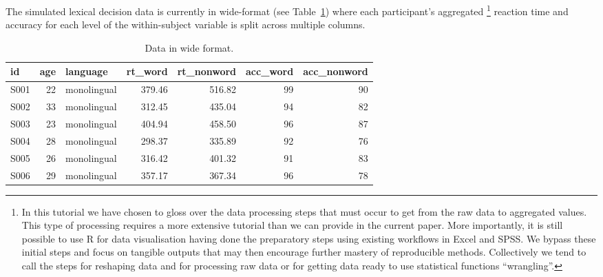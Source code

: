 \documentclass[
  english,
  doc,floatsintext]{apa6}
\begin{document}
The simulated lexical decision data is currently in wide-format (see Table~\ref{tab:wide-data}) where each participant's aggregated \footnote{In this tutorial we have chosen to gloss over the data processing steps that must occur to get from the raw data to aggregated values. This type of processing requires a more extensive tutorial than we can provide in the current paper. More importantly, it is still possible to use R for data visualisation having done the preparatory steps using existing workflows in Excel and SPSS. We bypass these initial steps and focus on tangible outputs that may then encourage further mastery of reproducible methods. Collectively we tend to call the steps for reshaping data and for processing raw data or for getting data ready to use statistical functions ``wrangling''.} reaction time and accuracy for each level of the within-subject variable is split across multiple columns.

\begin{table}

\caption{\label{tab:wide-data}Data in wide format.}
\centering
\begin{tabular}[t]{l|r|l|r|r|r|r}
\hline
id & age & language & rt\_word & rt\_nonword & acc\_word & acc\_nonword\\
\hline
S001 & 22 & monolingual & 379.46 & 516.82 & 99 & 90\\
\hline
S002 & 33 & monolingual & 312.45 & 435.04 & 94 & 82\\
\hline
S003 & 23 & monolingual & 404.94 & 458.50 & 96 & 87\\
\hline
S004 & 28 & monolingual & 298.37 & 335.89 & 92 & 76\\
\hline
S005 & 26 & monolingual & 316.42 & 401.32 & 91 & 83\\
\hline
S006 & 29 & monolingual & 357.17 & 367.34 & 96 & 78\\
\hline
\end{tabular}
\end{table}
\end{document}

